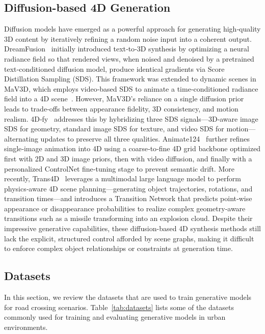 \documentclass{article}
\begin{document}
\subsection{Diffusion-based 4D Generation}

Diffusion models have emerged as a powerful approach for generating high‐quality 3D content by iteratively refining a random noise input into a coherent output. DreamFusion~\cite{poole2022dreamfusion} initially introduced text‐to‐3D synthesis by optimizing a neural radiance field so that rendered views, when noised and denoised by a pretrained text‐conditioned diffusion model, produce identical gradients via Score Distillation Sampling (SDS). This framework was extended to dynamic scenes in MaV3D, which employs video‐based SDS to animate a time‐conditioned radiance field into a 4D scene~\cite{singer2023text}. However, MaV3D’s reliance on a single diffusion prior leads to trade‐offs between appearance fidelity, 3D consistency, and motion realism. 4D‐fy~\cite{bahmani20244d} addresses this by hybridizing three SDS signals—3D‐aware image SDS for geometry, standard image SDS for texture, and video SDS for motion—alternating updates to preserve all three qualities. Animate124~\cite{zhao2023animate124} further refines single‐image animation into 4D using a coarse‐to‐fine 4D grid backbone optimized first with 2D and 3D image priors, then with video diffusion, and finally with a personalized ControlNet fine‐tuning stage to prevent semantic drift. More recently, Trans4D~\cite{zeng2024trans4d} leverages a multimodal large language model to perform physics‐aware 4D scene planning—generating object trajectories, rotations, and transition times—and introduces a Transition Network that predicts point‐wise appearance or disappearance probabilities to realize complex geometry‐aware transitions such as a missile transforming into an explosion cloud. Despite their impressive generative capabilities, these diffusion-based 4D synthesis methods still lack the explicit, structured control afforded by scene graphs, making it difficult to enforce complex object relationships or constraints at generation time.


\subsection{Datasets}

In this section, we review the datasets that are used to train generative models for road crossing scenarios. Table~\ref{tab:datasets} lists some of the datasets commonly used for training and evaluating generative models in urban environments.
\end{document}
